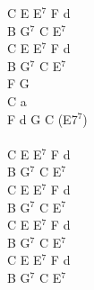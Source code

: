 \documentclass[a5paper, 10pt]{book}
\begin{document}
\begin{minipage}[t]{0.25\textwidth}
C E E$^7$ F d\\
B G$^7$ C E$^7$\\
C E E$^7$ F d\\
B G$^7$ C E$^7$\\

F G\\
C a\\
F d G C (E7$^7$)\\
\\
C E E$^7$ F d\\
B G$^7$ C E$^7$\\
C E E$^7$ F d\\
B G$^7$ C E$^7$\\

C E E$^7$ F d\\
B G$^7$ C E$^7$\\
C E E$^7$ F d\\
B G$^7$ C E$^7$\\

\end{minipage}
\vfill
\end{document}
